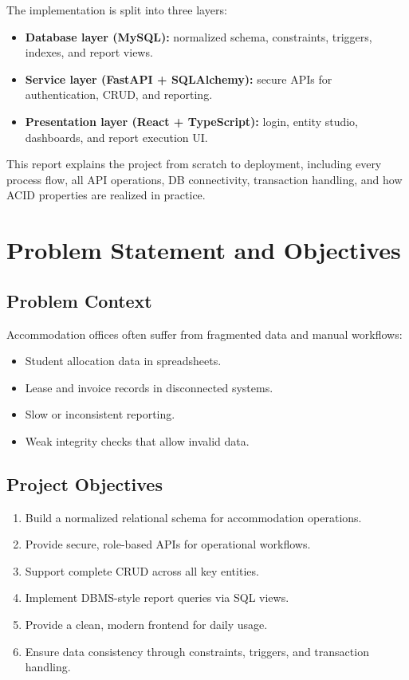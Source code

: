 \documentclass[11pt,a4paper]{article}
\begin{document}
The implementation is split into three layers:
\begin{itemize}
  \item \textbf{Database layer (MySQL):} normalized schema, constraints, triggers, indexes, and report views.
  \item \textbf{Service layer (FastAPI + SQLAlchemy):} secure APIs for authentication, CRUD, and reporting.
  \item \textbf{Presentation layer (React + TypeScript):} login, entity studio, dashboards, and report execution UI.
\end{itemize}

This report explains the project from scratch to deployment, including every process flow, all API operations, DB connectivity, transaction handling, and how ACID properties are realized in practice.

\section{Problem Statement and Objectives}
\subsection{Problem Context}
Accommodation offices often suffer from fragmented data and manual workflows:
\begin{itemize}
  \item Student allocation data in spreadsheets.
  \item Lease and invoice records in disconnected systems.
  \item Slow or inconsistent reporting.
  \item Weak integrity checks that allow invalid data.
\end{itemize}

\subsection{Project Objectives}
\begin{enumerate}
  \item Build a normalized relational schema for accommodation operations.
  \item Provide secure, role-based APIs for operational workflows.
  \item Support complete CRUD across all key entities.
  \item Implement DBMS-style report queries via SQL views.
  \item Provide a clean, modern frontend for daily usage.
  \item Ensure data consistency through constraints, triggers, and transaction handling.
\end{enumerate}
\end{document}
